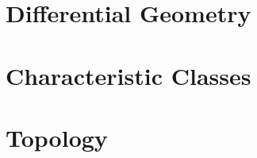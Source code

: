\documentclass{lkx_thesis}
\begin{document}
% 
%
% 
%
% 
%
% 

\begin{appendices}
	\chapter{Differential Geometry}\label{chap:differential_geometry}
	

	\chapter{Characteristic Classes}\label{chap:characteristic_classes}
	

	\chapter{Topology}\label{chap:topology}
	
\end{appendices}

\lkxrefs
\lkxindex
\end{document}

